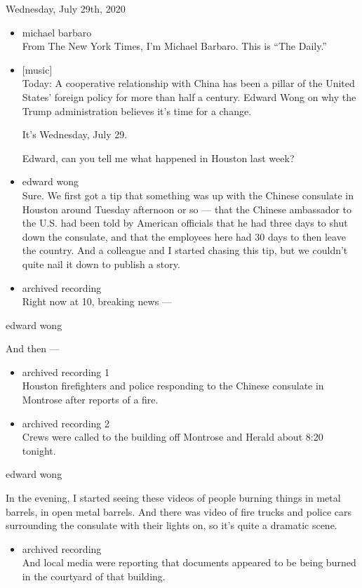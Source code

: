 Wednesday, July 29th, 2020

\begin{itemize}
\item
  michael barbaro\\
  From The New York Times, I'm Michael Barbaro. This is ``The Daily.''
\item
  {[}music{]}\\
  Today: A cooperative relationship with China has been a pillar of the
  United States' foreign policy for more than half a century. Edward
  Wong on why the Trump administration believes it's time for a change.

  It's Wednesday, July 29.

  Edward, can you tell me what happened in Houston last week?
\item
  edward wong\\
  Sure. We first got a tip that something was up with the Chinese
  consulate in Houston around Tuesday afternoon or so --- that the
  Chinese ambassador to the U.S. had been told by American officials
  that he had three days to shut down the consulate, and that the
  employees here had 30 days to then leave the country. And a colleague
  and I started chasing this tip, but we couldn't quite nail it down to
  publish a story.
\item
  archived recording\\
  Right now at 10, breaking news ---
\end{itemize}

edward wong

And then ---

\begin{itemize}
\item
  archived recording 1\\
  Houston firefighters and police responding to the Chinese consulate in
  Montrose after reports of a fire.
\item
  archived recording 2\\
  Crews were called to the building off Montrose and Herald about 8:20
  tonight.
\end{itemize}

edward wong

In the evening, I started seeing these videos of people burning things
in metal barrels, in open metal barrels. And there was video of fire
trucks and police cars surrounding the consulate with their lights on,
so it's quite a dramatic scene.

\begin{itemize}
\tightlist
\item
  archived recording\\
  And local media were reporting that documents appeared to be being
  burned in the courtyard of that building.
\end{itemize}


